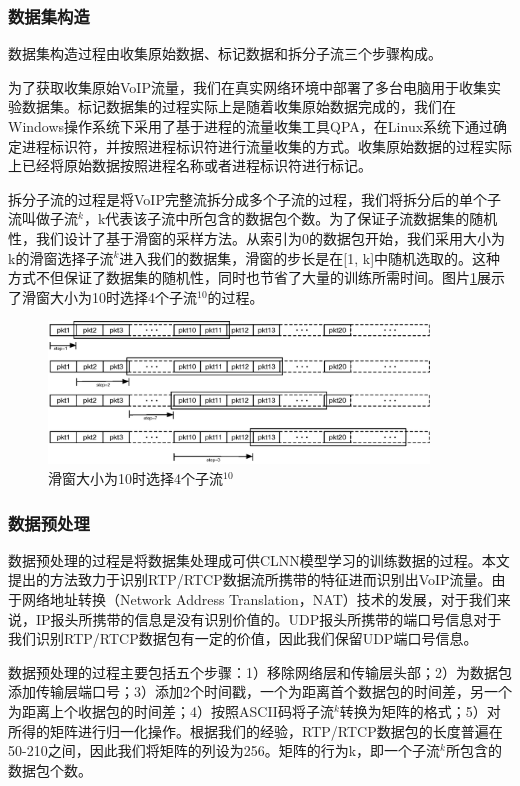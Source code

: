 \subsubsection{数据集构造}
\label{sec:construct}
数据集构造过程由收集原始数据、标记数据和拆分子流三个步骤构成。

为了获取收集原始VoIP流量，我们在真实网络环境中部署了多台电脑用于收集实验数据集。标记数据集的过程实际上是随着收集原始数据完成的，我们在Windows操作系统下采用了基于进程的流量收集工具QPA，在Linux系统下通过确定进程标识符，并按照进程标识符进行流量收集的方式。收集原始数据的过程实际上已经将原始数据按照进程名称或者进程标识符进行标记。

拆分子流的过程是将VoIP完整流拆分成多个子流的过程，我们将拆分后的单个子流叫做子流$^k$，k代表该子流中所包含的数据包个数。为了保证子流数据集的随机性，我们设计了基于滑窗的采样方法。从索引为0的数据包开始，我们采用大小为k的滑窗选择子流$^k$进入我们的数据集，滑窗的步长是在[1, k]中随机选取的。这种方式不但保证了数据集的随机性，同时也节省了大量的训练所需时间。图片\ref{fig:dataset}展示了滑窗大小为10时选择4个子流$^{10}$的过程。
\begin{figure}[thb]
\begin{center}
\includegraphics[width=0.9\textwidth]{figures/dataset.eps}
\caption{滑窗大小为10时选择4个子流$^{10}$}\label{fig:dataset}
\end{center}
\end{figure}

\subsubsection{数据预处理}
数据预处理的过程是将数据集处理成可供CLNN模型学习的训练数据的过程。本文提出的方法致力于识别RTP/RTCP数据流所携带的特征进而识别出VoIP流量。由于网络地址转换（Network Address Translation，NAT）技术的发展，对于我们来说，IP报头所携带的信息是没有识别价值的。UDP报头所携带的端口号信息对于我们识别RTP/RTCP数据包有一定的价值，因此我们保留UDP端口号信息。

数据预处理的过程主要包括五个步骤：1）移除网络层和传输层头部；2）为数据包添加传输层端口号；3）添加2个时间戳，一个为距离首个数据包的时间差，另一个为距离上个收据包的时间差；4）按照ASCII码将子流$^k$转换为矩阵的格式；5）对所得的矩阵进行归一化操作。根据我们的经验，RTP/RTCP数据包的长度普遍在50-210之间，因此我们将矩阵的列设为256。矩阵的行为k，即一个子流$^k$所包含的数据包个数。

